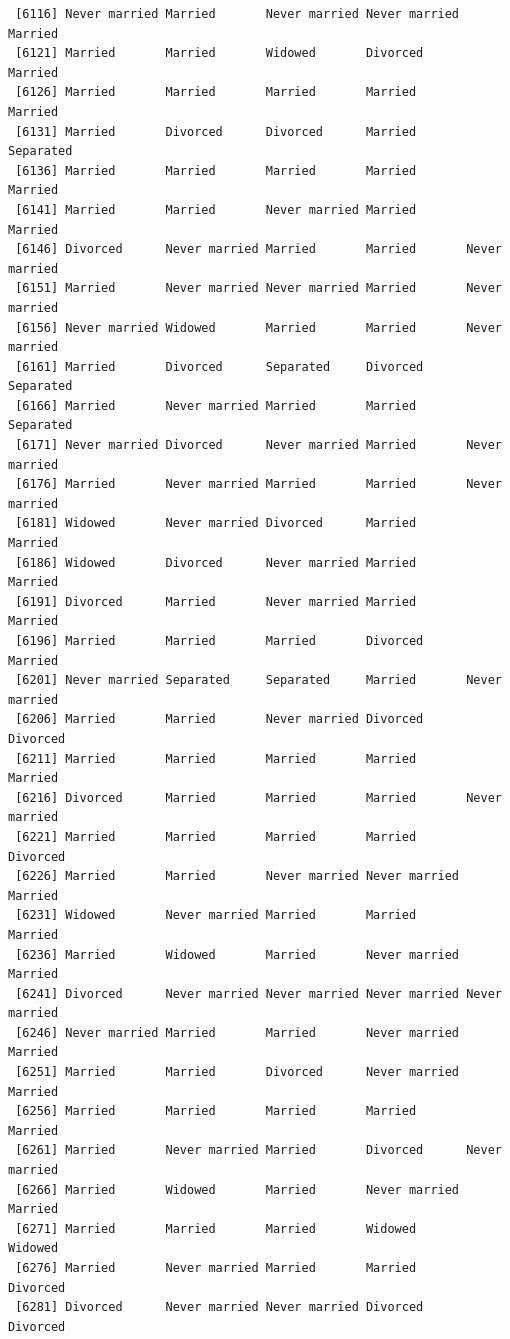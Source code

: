 \documentclass[
  letterpaper,
  DIV=11,
  numbers=noendperiod,
  oneside]{scrartcl}
\begin{document}
\begin{verbatim}
 [6116] Never married Married       Never married Never married Married      
 [6121] Married       Married       Widowed       Divorced      Married      
 [6126] Married       Married       Married       Married       Married      
 [6131] Married       Divorced      Divorced      Married       Separated    
 [6136] Married       Married       Married       Married       Married      
 [6141] Married       Married       Never married Married       Married      
 [6146] Divorced      Never married Married       Married       Never married
 [6151] Married       Never married Never married Married       Never married
 [6156] Never married Widowed       Married       Married       Never married
 [6161] Married       Divorced      Separated     Divorced      Separated    
 [6166] Married       Never married Married       Married       Separated    
 [6171] Never married Divorced      Never married Married       Never married
 [6176] Married       Never married Married       Married       Never married
 [6181] Widowed       Never married Divorced      Married       Married      
 [6186] Widowed       Divorced      Never married Married       Married      
 [6191] Divorced      Married       Never married Married       Married      
 [6196] Married       Married       Married       Divorced      Married      
 [6201] Never married Separated     Separated     Married       Never married
 [6206] Married       Married       Never married Divorced      Divorced     
 [6211] Married       Married       Married       Married       Married      
 [6216] Divorced      Married       Married       Married       Never married
 [6221] Married       Married       Married       Married       Divorced     
 [6226] Married       Married       Never married Never married Married      
 [6231] Widowed       Never married Married       Married       Married      
 [6236] Married       Widowed       Married       Never married Married      
 [6241] Divorced      Never married Never married Never married Never married
 [6246] Never married Married       Married       Never married Married      
 [6251] Married       Married       Divorced      Never married Married      
 [6256] Married       Married       Married       Married       Married      
 [6261] Married       Never married Married       Divorced      Never married
 [6266] Married       Widowed       Married       Never married Married      
 [6271] Married       Married       Married       Widowed       Widowed      
 [6276] Married       Never married Married       Married       Divorced     
 [6281] Divorced      Never married Never married Divorced      Divorced     

\end{verbatim}
\end{document}
